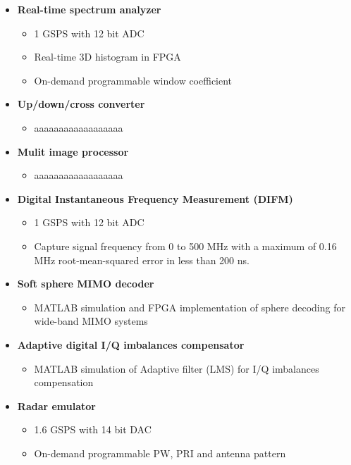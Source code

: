 
\begin{itemize}
	\item \textbf{Real-time spectrum analyzer}
	      \begin{itemize}
		      \item 1 GSPS with 12 bit ADC
		      \item Real-time 3D histogram in FPGA
		      \item On-demand programmable window coefficient
	      \end{itemize}
	\item \textbf{Up/down/cross converter}
	      \begin{itemize}
		      \item aaaaaaaaaaaaaaaaaa
	      \end{itemize}
	\item \textbf{Mulit image processor}
	      \begin{itemize}
		      \item aaaaaaaaaaaaaaaaaa
	      \end{itemize}
	\item \textbf{Digital Instantaneous Frequency Measurement (DIFM)}
	      \begin{itemize}
		      \item 1 GSPS with 12 bit ADC
		      \item Capture signal frequency from 0 to 500 MHz with a maximum of 0.16 MHz root-mean-squared error in less than 200 ns.
	      \end{itemize}
	\item \textbf{Soft sphere MIMO decoder}
	      \begin{itemize}
		      \item MATLAB simulation and FPGA implementation of sphere decoding for wide-band MIMO systems
	      \end{itemize}
	\item \textbf{Adaptive digital I/Q imbalances compensator}
	      \begin{itemize}
		      \item MATLAB simulation of Adaptive filter (LMS) for I/Q imbalances compensation
	      \end{itemize}
	\item \textbf{Radar emulator}
	      \begin{itemize}
		      \item 1.6 GSPS with 14 bit DAC
		      \item On-demand programmable PW, PRI and antenna pattern
	      \end{itemize}
\end{itemize}